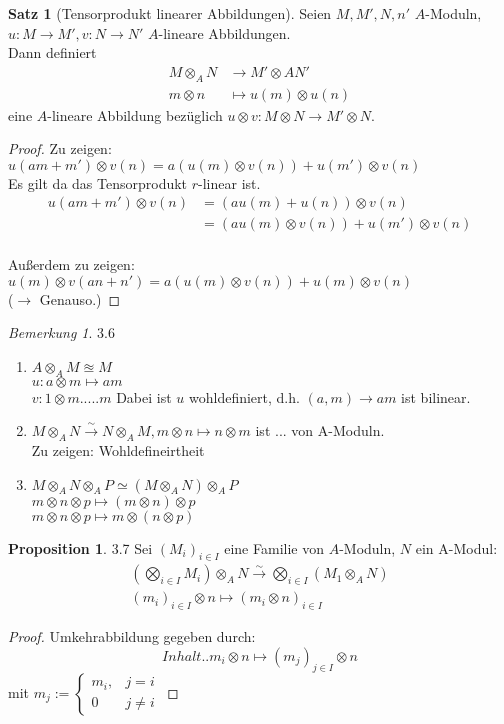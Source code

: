 \documentclass[10pt,a4paper]{article}
\newcounter{thm}[section]
\theoremstyle{definition}
\newtheorem{satz}[thm]{Satz}
\newtheorem{prop}[thm]{Proposition}
\theoremstyle{plain}
\theoremstyle{remark}
\newtheorem{bem}[thm]{Bemerkung}
\begin{document}
\begin{satz}[Tensorprodukt linearer Abbildungen]
	Seien $M,M',N,n'$ $A$-Moduln, $u:M\rightarrow M',v:N\rightarrow N'$ $A$-lineare Abbildungen.\\
	Dann definiert
	\begin{align*}
	M\otimes_A N&\rightarrow M'\otimes A N'\\
	m\otimes n &\mapsto u(m)\otimes u(n)
	\end{align*}
	eine $A$-lineare Abbildung bezüglich $u\otimes v:M\otimes N\rightarrow M'\otimes N$.
\end{satz}
\begin{proof}
	Zu zeigen: $u(am+m')\otimes v(n)=a(u(m)\otimes v(n))+u(m')\otimes v(n)$\\
	Es gilt da das Tensorprodukt $r$-linear ist.
	\begin{align*}
	u(am+m')\otimes v(n)&=(au(m)+u(n))\otimes v(n)\\
	&=(au(m)\otimes v(n))+u(m')\otimes v(n)
	\end{align*}
	\\
	Außerdem zu zeigen: $u(m)\otimes v(an+n')=a(u(m)\otimes v(n))+u(m)\otimes v(n)$\\
	($\rightarrow $ Genauso.)
\end{proof}
\begin{bem}
	3.6\\
	\begin{enumerate}
		\item $A\otimes_A M\approxeq M$\\
		$u: a\otimes m\mapsto am$\\
		$v: 1\otimes m.....m $
		Dabei ist $u$ wohldefiniert, d.h. $(a,m)\rightarrow am$ ist bilinear.
		\item $M\otimes_A N\xrightarrow{\sim}N\otimes_A M, m\otimes n\mapsto n\otimes m$ ist ... von A-Moduln.\\
		Zu zeigen: Wohldefineirtheit 
		\item $M\otimes_A N\otimes_A P\simeq (M\otimes_A N)\otimes_A P$\\
		$m\otimes n\otimes p\mapsto (m\otimes n)\otimes p$\\
		$m\otimes n\otimes p\mapsto m\otimes (n\otimes p)$
	\end{enumerate}
\end{bem}
\begin{prop}3.7
	Sei $(M_i)_{i\in I}$ eine Familie von $A$-Moduln, $N$ ein A-Modul:\begin{align*}
	\left(\bigotimes_{i\in I}M_i\right)\otimes_A N\xrightarrow{\sim} \bigotimes_{i\in I}\left(M_1\otimes_A N\right)\\
	(m_i)_{i\in I}\otimes n\mapsto(m_i\otimes n)_{i\in I}
	\end{align*}
\end{prop}
\begin{proof}
	Umkehrabbildung gegeben durch:\[Inhalt..m_i\otimes n\mapsto (m_j)_{j\in I}\otimes n\]
	mit $m_j:=\begin{cases}
	m_i, &j=i\\
	0 &j\neq i
	\end{cases}$
\end{proof}
\end{document}

